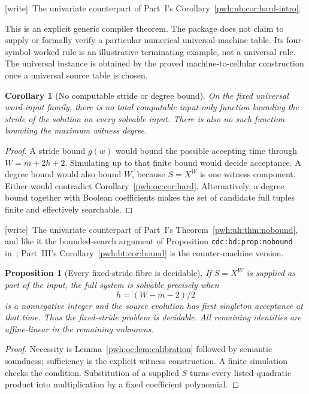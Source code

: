 \documentclass[11pt,letterpaper]{article}
\numberwithin{equation}{section}
\newtheorem{proposition}[theorem]{Proposition}
\newtheorem{corollary}[theorem]{Corollary}
\theoremstyle{definition}
\newcommand{\wtag}{\textup{[write]}}
\begin{document}
\wtag\ The univariate counterpart of Part~I's
Corollary~\ref{pwh:uh:cor:hard-intro}.

This is an explicit generic compiler theorem. The package does not claim
to supply or formally verify a particular numerical universal-machine
table. Its four-symbol worked rule is an illustrative terminating example,
not a universal rule. The universal instance is obtained by the proved
machine-to-cellular construction once a universal source table is chosen.

\begin{corollary}[No computable stride or degree bound]
\label{pwh:oc:cor:nobound}
On the fixed universal word-input family, there is no total computable
input-only function bounding the stride of the solution on every
solvable input. There is also no such function bounding the maximum
witness degree.
\end{corollary}

\begin{proof}
A stride bound $g(w)$ would bound the possible accepting time through
$W=m+2h+2$. Simulating up to that finite bound would decide acceptance.
A degree bound would also bound $W$, because $S=X^W$ is one witness
component. Either would contradict Corollary~\ref{pwh:oc:cor:hard}.
Alternatively, a degree bound together with Boolean coefficients makes
the set of candidate full tuples finite and effectively searchable.
\end{proof}

\wtag\ The univariate counterpart of Part~I's
Theorem~\ref{pwh:uh:thm:nobound}, and like it the bounded-search argument
of Proposition \texttt{cdc:bd:prop:nobound} in~\cite{cdc}; Part~III's
Corollary~\ref{pwh:bt:cor:bound} is the counter-machine version.

\begin{proposition}[Every fixed-stride fibre is decidable]
\label{pwh:oc:prop:fibre}
If $S=X^W$ is supplied as part of the input, the full system is solvable
precisely when
\[
 h=(W-m-2)/2
\]
is a nonnegative integer and the source evolution has first singleton
acceptance at that time. Thus the fixed-stride problem is decidable.
All remaining identities are affine-linear in the remaining unknowns.
\end{proposition}

\begin{proof}
Necessity is Lemma~\ref{pwh:oc:lem:calibration} followed by semantic soundness;
sufficiency is the explicit witness construction. A finite simulation
checks the condition. Substitution of a supplied $S$ turns every listed
quadratic product into multiplication by a fixed coefficient polynomial.
\end{proof}
\end{document}
